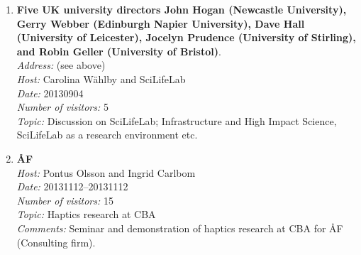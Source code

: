 \begin{enumerate}
\item 
{\bf Five UK university directors John Hogan (Newcastle University), Gerry Webber (Edinburgh Napier University), Dave Hall (University of Leicester), Jocelyn Prudence (University of Stirling), and Robin Geller (University of Bristol)}.~\\
{\em Address:} (see above)~\\
{\em Host:} Carolina W\"{a}hlby and SciLifeLab~\\
{\em Date:} 20130904~\\
{\em Number of visitors:} 5~\\
{\em Topic:} Discussion on SciLifeLab; Infrastructure and High Impact Science, SciLifeLab as a research environment etc.

\item 
{\bf {\AA}F}~\\
{\em Host:} Pontus Olsson and Ingrid Carlbom~\\
{\em Date:} 20131112--20131112~\\
{\em Number of visitors:} 15~\\
{\em Topic:} Haptics research at CBA~\\
{\em Comments:} Seminar and demonstration of haptics research at CBA for {\AA}F (Consulting firm).















\end{enumerate}
